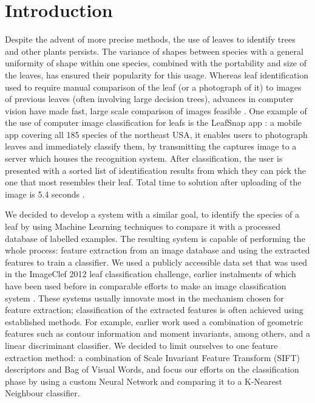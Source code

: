 \section{Introduction}
Despite the advent of more precise methods, the use of leaves to identify trees and other plants persists. The variance of shapes between species with a general uniformity of shape within one species, combined with the portability and size of the leaves, has ensured their popularity for this usage. 
Whereas leaf identification used to require manual comparison of the leaf (or a photograph of it) to images of previous leaves (often involving large decision trees), advances in computer vision have made fast, large scale comparison of images feasible \cite{Belh2008}. One example of the use of computer image classification for leafs is the LeafSnap app \cite{Kuma2012}: a mobile app covering all 185 species of the northeast USA, it enables users to photograph leaves and immediately classify them, by transmitting the captures image to a server which houses the recognition system. After classification, the user is presented with a sorted list of identification results from which they can pick the one that most resembles their leaf. Total time to solution after uploading of the image is 5.4 seconds \cite{Kuma2012}.

We decided to develop a system with a similar goal, to identify the species of a leaf by using Machine Learning techniques to compare it with a processed database of labelled examples. The resulting system is capable of performing the whole process: feature extraction from an image database and using the extracted features to train a classifier. We used a publicly accessible data set that was used in the ImageClef 2012 leaf classification challenge, earlier instalments of which have been used before in comparable efforts to make an image classification system \cite{Goea2011}. These systems usually innovate most in the mechanism chosen for feature extraction; classification of the extracted features is often achieved using established methods. For example, earlier work \cite{Kaly2015} used a combination of geometric features such as contour information and moment invariants, among others, and a linear discriminant classifier.
We decided to limit ourselves to one feature extraction method: a combination of Scale Invariant Feature Transform (SIFT) descriptors and Bag of Visual Words, and focus our efforts on the classification phase by using a custom Neural Network and comparing it to a K-Nearest Neighbour classifier.


